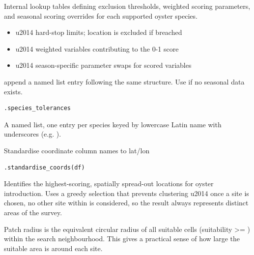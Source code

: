 \documentclass[a4paper]{book}
\begin{document}
\begin{Description}
Internal lookup tables defining exclusion thresholds, weighted scoring
parameters, and seasonal scoring overrides for each supported oyster species.

\begin{itemize}

\item{}          \bsl{}u2014 hard-stop limits; location is excluded if breached
\item{}              \bsl{}u2014 weighted variables contributing to the 0-1 score
\item{}  \bsl{}u2014 season-specific parameter swaps for scored variables

\end{itemize}


 append a named list entry following the same
structure. Use  if no seasonal data exists.
\end{Description}
%
\begin{Usage}
\begin{verbatim}
.species_tolerances
\end{verbatim}
\end{Usage}
%
\begin{Format}
A named list, one entry per species keyed by lowercase Latin name
with underscores (e.g. ).
\end{Format}
%
\begin{Description}
Standardise coordinate column names to lat/lon
\end{Description}
%
\begin{Usage}
\begin{verbatim}
.standardise_coords(df)
\end{verbatim}
\end{Usage}
%
\begin{Description}
Identifies the highest-scoring, spatially spread-out locations for oyster
introduction. Uses a greedy selection that prevents clustering \bsl{}u2014 once a site
is chosen, no other site within  is considered, so the
result always represents distinct areas of the survey.

Patch radius is the equivalent circular radius of all suitable cells
(suitability >= ) within the search neighbourhood. This
gives a practical sense of how large the suitable area is around each site.
\end{Description}
\end{document}
